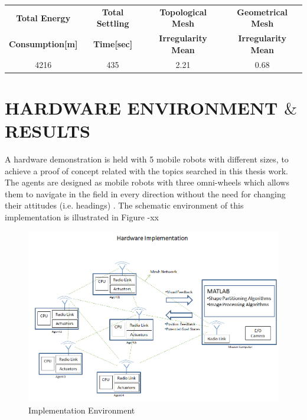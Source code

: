 \documentclass[twoside]{article}
\begin{document}
			\begin{center}
				 \label{tab:title} 
				\begin{tabular}{||c| c |c |c ||}
					
					\hline
					\textbf{Total Energy }  & \textbf{Total Settling} & \textbf{Topological Mesh} & \textbf{Geometrical Mesh} \\ \textbf{Consumption[m]} & \textbf{Time[sec]}& \textbf{Irregularity Mean} & \textbf{Irregularity Mean} \\
					\hline
					4216 & 435 &  2.21& 0.68\\
					\hline
				\end{tabular}
			\end{center}
		
		
		\section{HARDWARE ENVIRONMENT $\&$ RESULTS}
		
   A hardware demonstration is held with 5 mobile robots with different sizes, to achieve a proof of concept related with the topics searched in this thesis work. The agents are designed as mobile robots with three omni-wheels which allows them to navigate in the field in every direction without the need for changing their attitudes (i.e. headings) .  The schematic environment of this implementation is illustrated in Figure -xx
   
 	\begin{figure}[H]
 		\caption{Implementation Environment}
 		\centerline{\includegraphics[scale = 0.55]{hardware}}
 	\end{figure} 
   
\end{document}
